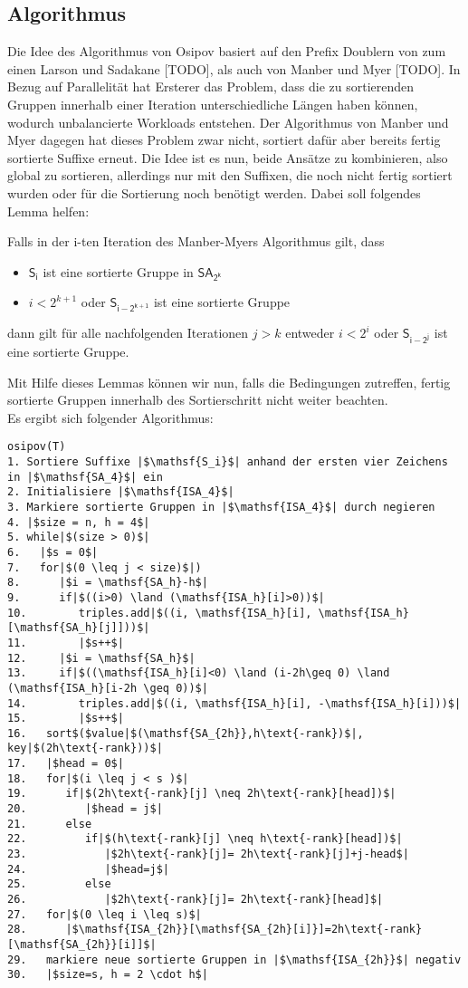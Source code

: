 \subsection{Algorithmus}
Die Idee des Algorithmus von Osipov basiert auf den Prefix Doublern von zum einen Larson und Sadakane [TODO], als auch von Manber und Myer [TODO]. In Bezug auf Parallelität hat Ersterer das Problem, dass die zu sortierenden Gruppen innerhalb einer Iteration unterschiedliche Längen haben können, wodurch unbalancierte Workloads entstehen. Der Algorithmus von Manber und Myer dagegen hat dieses Problem zwar nicht, sortiert dafür aber bereits fertig sortierte Suffixe erneut. Die Idee ist es nun, beide Ansätze zu kombinieren, also global zu sortieren, allerdings nur mit den Suffixen, die noch nicht fertig sortiert wurden oder für die Sortierung noch benötigt werden. Dabei soll folgendes Lemma helfen:
\begin{lemma}
Falls in der i-ten Iteration des Manber-Myers Algorithmus gilt, dass
\begin{itemize}
\item $\mathsf{S_i}$ ist eine sortierte Gruppe in $\mathsf{SA_{2^k}}$
\item $i < 2^{k+1}$ oder $\mathsf{S_{i-2^{k+1}}}$ ist eine sortierte Gruppe
\end{itemize} 
dann gilt für alle nachfolgenden Iterationen $j>k$ entweder $i<2^i$ oder $\mathsf{S_{i-2^j}}$ ist eine sortierte Gruppe.
\end{lemma}
Mit Hilfe dieses Lemmas können wir nun, falls die Bedingungen zutreffen, fertig sortierte Gruppen innerhalb des Sortierschritt nicht weiter beachten.\\
Es ergibt sich folgender Algorithmus:
\newpage
\begin{verbatim}
osipov(T)
1. Sortiere Suffixe |$\mathsf{S_i}$| anhand der ersten vier Zeichens in |$\mathsf{SA_4}$| ein 
2. Initialisiere |$\mathsf{ISA_4}$| 
3. Markiere sortierte Gruppen in |$\mathsf{ISA_4}$| durch negieren
4. |$size = n, h = 4$| 
5. while|$(size > 0)$|  
6.   |$s = 0$|
7.   for|$(0 \leq j < size)$|)
8.      |$i = \mathsf{SA_h}-h$|
9.      if|$((i>0) \land (\mathsf{ISA_h}[i]>0))$|
10.        triples.add|$((i, \mathsf{ISA_h}[i], \mathsf{ISA_h}[\mathsf{SA_h}[j]]))$|
11.        |$s++$|
12.     |$i = \mathsf{SA_h}$|
13.     if|$((\mathsf{ISA_h}[i]<0) \land (i-2h\geq 0) \land (\mathsf{ISA_h}[i-2h \geq 0))$|
14.        triples.add|$((i, \mathsf{ISA_h}[i], -\mathsf{ISA_h}[i]))$|
15.        |$s++$|
16.   sort$($value|$(\mathsf{SA_{2h}},h\text{-rank})$|, key|$(2h\text{-rank}))$|
17.   |$head = 0$|
18.   for|$(i \leq j < s )$|
19.      if|$(2h\text{-rank}[j] \neq 2h\text{-rank}[head])$|
20.         |$head = j$|
21.      else
22.         if|$(h\text{-rank}[j] \neq h\text{-rank}[head])$|
23.            |$2h\text{-rank}[j]= 2h\text{-rank}[j]+j-head$|
24.            |$head=j$|
25.         else
26.            |$2h\text{-rank}[j]= 2h\text{-rank}[head]$|
27.   for|$(0 \leq i \leq s)$|
28.      |$\mathsf{ISA_{2h}}[\mathsf{SA_{2h}[i]}]=2h\text{-rank}[\mathsf{SA_{2h}}[i]]$|
29.   markiere neue sortierte Gruppen in |$\mathsf{ISA_{2h}}$| negativ
30.   |$size=s, h = 2 \cdot h$| 
\end{verbatim}

